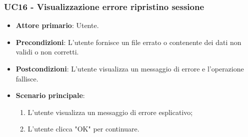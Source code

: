 \subsubsection{UC16 - Visualizzazione errore ripristino sessione}
\begin{itemize}
	\item \textbf{Attore primario}: Utente.
	\item \textbf{Precondizioni}: L'utente fornisce un file errato o contenente dei dati non validi o non corretti.
	\item \textbf{Postcondizioni}: L'utente visualizza un messaggio di errore e l'operazione fallisce.
	\item \textbf{Scenario principale}:
		\begin{enumerate}
			\item L'utente visualizza un messaggio di errore esplicativo;
			\item L'utente clicca "OK" per continuare.
		\end{enumerate}
\end{itemize}